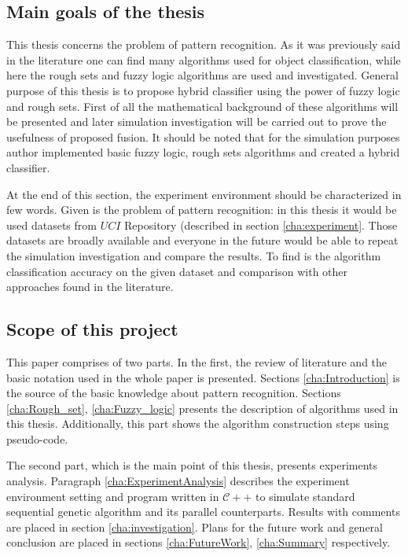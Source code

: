 \subsection{Main goals of the thesis}
This thesis concerns the problem of pattern recognition. As it was previously
said in the literature one can find many algorithms used for object
classification, while here the rough sets and fuzzy logic algorithms are used 
and investigated. General purpose of this thesis is to propose hybrid
classifier using the power of fuzzy logic and rough sets. First of all the
mathematical background of these algorithms will be presented and later
simulation investigation will be carried out to prove the usefulness of
proposed fusion. It should be noted that for the simulation purposes author
implemented basic fuzzy logic, rough sets algorithms and created a hybrid
classifier.

At the end of this section, the experiment environment should be characterized in
few words. Given is the problem of pattern recognition: in this thesis it would
be used datasets from $UCI$ Repository (described in section
\ref{cha:experiment}. Those datasets are broadly available and everyone in the
future would be able to repeat the simulation investigation and compare the
results. To find is the algorithm classification accuracy on the given dataset
and comparison with other approaches found in the literature. 

\subsection{Scope of this project}
This paper comprises of two parts. In the first, the review of
literature and the basic notation used in the whole paper is presented. Sections
\ref{cha:Introduction} is the source of the basic
knowledge about pattern recognition. Sections \ref{cha:Rough_set}, \ref{cha:Fuzzy_logic}
presents the description of algorithms used in this thesis. Additionally, this
part shows the algorithm construction steps using pseudo-code.

The second part, which is the main point of this thesis, presents experiments analysis.
Paragraph \ref{cha:ExperimentAnalysis} describes the experiment environment
setting and program written in $\mathcal{C++}$ to simulate standard sequential genetic
algorithm and its parallel counterparts. Results with comments are placed in
section \ref{cha:investigation}. Plans for the future work and general
conclusion are placed in sections \ref{cha:FutureWork}, \ref{cha:Summary}
respectively. 

